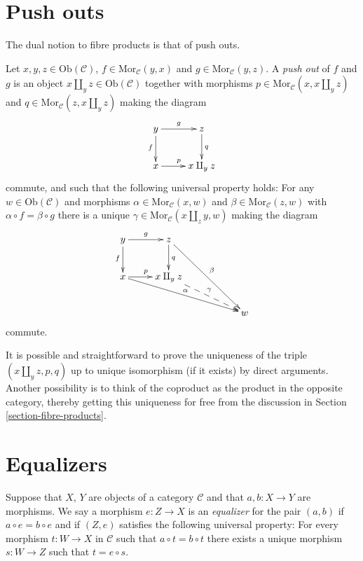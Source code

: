 \section{Push outs}
\label{section-pushouts}

\noindent
The dual notion to fibre products is that of push outs.

\begin{definition}
\label{definition-pushouts}
Let $x,y,z\in \text{Ob}(\mathcal{C})$,
$f\in \text{Mor}_{\mathcal{C}}(y, x)$
and $g\in \text{Mor}_{\mathcal C}(y, z)$.
A {\it push out} of $f$ and $g$ is
an object $x\amalg_y z\in \text{Ob}(\mathcal{C})$
together with morphisms 
$p\in \text{Mor}_{\mathcal C}(x, x\amalg_y z)$ and 
$q\in\text{Mor}_{\mathcal C}(z, x\amalg_y z)$ making the diagram
$$
\xymatrix{
y \ar[r]^{g} \ar[d]_{f}
&
z \ar[d]^{q}
\\
x \ar[r]^{p}
&
x\amalg_y z
}
$$
commute, and such that the following universal property holds:
For any $w\in \text{Ob}(\mathcal{C})$ and morphisms 
$\alpha \in \text{Mor}_{\mathcal C}(x, w)$ and 
$\beta \in \text{Mor}_{\mathcal{C}}(z, w)$ with
$\alpha \circ f = \beta \circ g$ there is a unique
$\gamma\in \text{Mor}_{\mathcal C}(x\amalg_z y, w)$ making
the diagram
$$
\xymatrix{
y \ar[r]^{g} \ar[d]_{f}
&
z \ar[d]^{q} \ar[rrdd]^\beta
&
&
\\
x \ar[r]^{p} \ar[rrrd]^\alpha
&
x\amalg_y z  \ar@{-->}[rrd]^\gamma
&
&
\\
&&&
w
}
$$
commute.
\end{definition}

\noindent
It is possible and straightforward to prove the uniqueness of the triple
$(x\amalg_y z, p, q)$ up to unique isomorphism (if it exists) by direct
arguments. Another possibility is to think of the coproduct as the
product in the opposite category, thereby getting this uniqueness for
free from the discussion in Section \ref{section-fibre-products}.

\section{Equalizers}
\label{section-equalizers}

\begin{definition}
\label{definition-equalizers}
Suppose that $X$, $Y$ are objects of a category $\mathcal{C}$
and that $a, b : X \to Y$ are morphisms. We say a morphism
$e : Z \to X$ is an {\it equalizer} for the pair $(a,b)$ if
$a \circ e = b \circ e$ and if $(Z,e)$ satisfies the following
universal property: For every morphism $t : W \to X$
in $\mathcal{C}$ such that $a \circ t = b \circ t$ there exists
a unique morphism $s : W \to Z$ such that $t = e \circ s$.
\end{definition}

